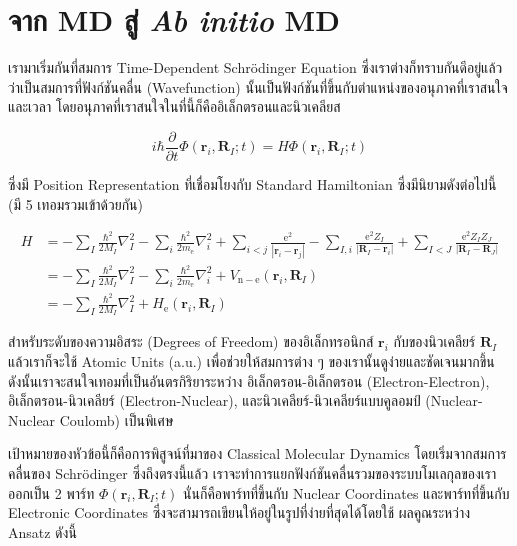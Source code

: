 \section{จาก MD สู่ \textit{Ab initio} MD}

เรามาเริ่มกันที่สมการ Time-Dependent Schr\"{o}dinger Equation ซึ่งเราต่างก็ทราบกันดีอยู่แล้วว่าเป็นสมการที่ฟังก์ชันคลื่น (Wavefunction)
นั้นเป็นฟังก์ชันที่ขึ้นกับตำแหน่งของอนุภาคที่เราสนใจและเวลา โดยอนุภาคที่เราสนใจในที่นี้ก็คืออิเล็กตรอนและนิวเคลียส

\begin{equation}
  \label{eq:AIMD_TDSE}
  i \hbar \frac{\partial}{\partial t} \Phi\left(\mathbf{r}_i,\mathbf{R}_I ; t\right)
  =
  H \Phi\left(\mathbf{r}_i,\mathbf{R}_I ; t\right)
\end{equation}

\noindent ซึ่งมี Position Representation ที่เชื่อมโยงกับ Standard Hamiltonian ซึ่งมีนิยามดังต่อไปนี้ (มี 5 เทอมรวมเข้าด้วยกัน)

\begin{equation}
  \label{eq:AIMD_Hamiltonian}
  \begin{aligned}
    H
     & = -\sum_I \frac{\hbar^2}{2 M_I} \nabla_I^2
    -\sum_i \frac{\hbar^2}{2 m_{\mathrm{e}}} \nabla_i^2
    +\sum_{i<j} \frac{\mathrm{e}^2}{\left|\mathbf{r}_i-\mathbf{r}_j\right|}
    -\sum_{I, i} \frac{\mathrm{e}^2 Z_I}{\left|\mathbf{R}_I-\mathbf{r}_i\right|}
    +\sum_{I<J} \frac{\mathrm{e}^2 Z_I Z_J}{\left|\mathbf{R}_I-\mathbf{R}_J\right|} \\
     & = -\sum_I \frac{\hbar^2}{2 M_I} \nabla_I^2
    -\sum_i \frac{\hbar^2}{2 m_{\mathrm{e}}} \nabla_i^2
    +V_{\mathrm{n}-\mathrm{e}}\left(\mathbf{r}_i,\mathbf{R}_I\right)                \\
     & = -\sum_I \frac{\hbar^2}{2 M_I} \nabla_I^2
    +H_{\mathrm{e}}\left(\mathbf{r}_i,\mathbf{R}_I\right)
  \end{aligned}
\end{equation}

\noindent สำหรับระดับของความอิสระ (Degrees of Freedom) ของอิเล็กทรอนิกส์ $\mathbf{r}_i$ กับของนิวเคลียร์ $\mathbf{R}_I$
แล้วเราก็จะใช้ Atomic Units (a.u.) เพื่อช่วยให้สมการต่าง ๆ ของเรานั้นดูง่ายและชัดเจนมากขึ้น ดังนั้นเราจะสนใจเทอมที่เป็นอันตรกิริยาระหว่าง
อิเล็กตรอน-อิเล็กตรอน (Electron-Electron), อิเล็กตรอน-นิวเคลียร์ (Electron-Nuclear), และนิวเคลียร์-นิวเคลียร์แบบคูลอมป์
(Nuclear-Nuclear Coulomb) เป็นพิเศษ

เป้าหมายของหัวข้อนี้ก็คือการพิสูจน์ที่มาของ Classical Molecular Dynamics โดยเริ่มจากสมการคลื่นของ Schr\"{o}dinger ซึ่งถึงตรงนี้แล้ว
เราจะทำการแยกฟังก์ชันคลื่นรวมของระบบโมเลกุลของเราออกเป็น 2 พาร์ท $\Phi\left(\mathbf{r}_i,\mathbf{R}_I ; t\right)$
นั่นก็คือพาร์ทที่ขึ้นกับ Nuclear Coordinates และพาร์ทที่ขึ้นกับ Electronic Coordinates ซึ่งจะสามารถเขียนให้อยู่ในรูปที่ง่ายที่สุดได้โดยใช้
ผลคูณระหว่าง Ansatz ดังนี้

